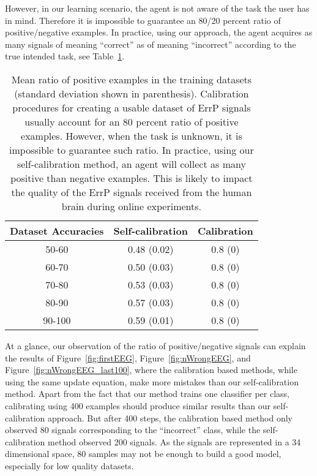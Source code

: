 However, in our learning scenario, the agent is not aware of the task the user has in mind. Therefore it is impossible to guarantee an 80/20 percent ratio of positive/negative examples. In practice, using our approach, the agent acquires as many signals of meaning ``correct'' as of meaning ``incorrect'' according to the true intended task, see Table~\ref{tab:correctLabelRatio}.

\begin{table}
\centering
{}
\begin{tabular}{c c c}
Dataset Accuracies & Self-calibration & Calibration \\ \hline
50-60 & 0.48 (0.02) & 0.8 (0) \\
60-70 & 0.50 (0.03) & 0.8 (0) \\
70-80 & 0.53 (0.03) & 0.8 (0) \\
80-90 & 0.57 (0.03) & 0.8 (0) \\
90-100 & 0.59 (0.01) & 0.8 (0) \\
\end{tabular}
\caption{Mean ratio of positive examples in the training datasets (standard deviation shown in parenthesis). Calibration procedures for creating a usable dataset of ErrP signals usually account for an 80 percent ratio of positive examples. However, when the task is unknown, it is impossible to guarantee such ratio. In practice, using our self-calibration method, an agent will collect as many positive than negative examples. This is likely to impact the quality of the ErrP signals received from the human brain during online experiments.}
\label{tab:correctLabelRatio}
\end{table}

At a glance, our observation of the ratio of positive/negative signals can explain the results of Figure~\ref{fig:firstEEG}, Figure~\ref{fig:nWrongEEG}, and Figure~\ref{fig:nWrongEEG_last100}, where the calibration based methods, while using the same update equation, make more mistakes than our self-calibration method. Apart from the fact that our method trains one classifier per class, calibrating using 400 examples should produce similar results than our self-calibration approach. But after 400 steps, the calibration based method only observed 80 signals corresponding to the ``incorrect'' class, while the self-calibration method observed 200 signals. As the signals are represented in a 34 dimensional space, 80 samples may not be enough to build a good model, especially for low quality datasets.

